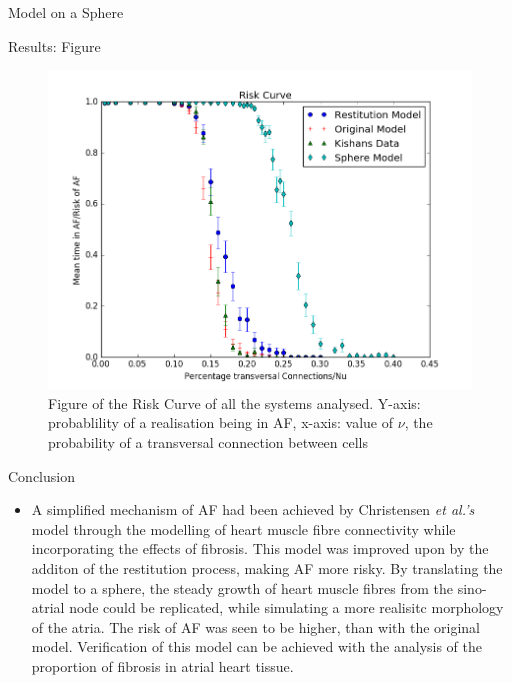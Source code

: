 \documentclass[final,hyperref={pdfpagelabels=false}]{beamer}
\begin{document}
\begin{frame}[t]
\begin{columns}[t]
\begin{column}{.465\textwidth}
\begin{block}{Model on a Sphere}
\end{block}

\begin{block}{Results: Figure}

\begin{figure}
\includegraphics[width=0.65\linewidth]{xriskcurvesphere}
\caption{Figure of the Risk Curve of all the systems analysed. Y-axis: probablility of a realisation being in AF, x-axis: value of $\nu$, the  probability of a transversal connection between cells}
\end{figure}

\end{block}


\begin{block}{Conclusion}
\begin{itemize}
\item A simplified mechanism of AF had been achieved by Christensen \emph{et al.'s} model through the modelling of heart muscle fibre connectivity while incorporating the effects of fibrosis. This model was improved upon by the additon of the restitution process, making AF more risky. By translating the model to a sphere, the steady growth of heart muscle fibres from the sino-atrial node could be replicated, while simulating a more realisitc morphology of the atria. The risk of AF was seen to be higher, than with the original model. Verification of this model can be achieved with the analysis of the proportion of fibrosis in atrial heart tissue. 
\end{itemize}
\end{block}



\end{column}
\end{columns}
\end{frame}
\end{document}
